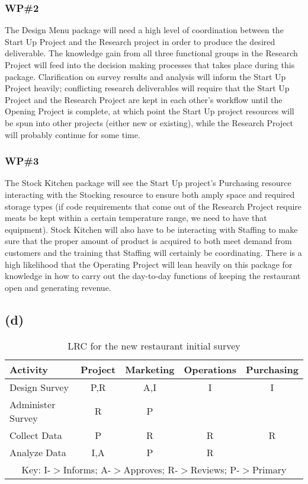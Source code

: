 \documentclass{article}
\begin{document}
	\subsubsection*{WP\#2}
	The Design Menu package will need a high level of coordination between the Start Up Project and the Research project in order to produce the desired deliverable. The knowledge gain from all three functional groups in the 		Research Project will feed into the decision making processes that takes place during this package. Clarification on survey results and analysis will inform the Start Up Project heavily; conflicting research deliverables will require 		that the Start Up Project and the Research Project are kept in each other's workflow until the Opening Project is complete, at which point the Start Up project resources will be spun into other projects (either new or existing), while 	the Research Project will probably 	continue for some time.
	\subsubsection*{WP\#3}
	The Stock Kitchen package will see the Start Up project's Purchasing resource interacting with the Stocking resource to ensure both amply space and required storage types (if code requirements that come out of the Research 		Project require meats be kept within a certain temperature range, we need to have that equipment). Stock Kitchen will also have to be interacting with Staffing to make sure that the proper amount of product is acquired to both meet 	demand from customers and the training that Staffing will certainly be coordinating. 
	\newline
	There is a high likelihood that the Operating Project will lean heavily on this package for knowledge in how to carry out the day-to-day functions of keeping the restaurant open and generating revenue.
		
	\subsection*{\quad(d)}
	{\renewcommand{\arraystretch}{1.2} 
	\begin{table}[h!]
  		\begin{center}
    		\caption{LRC for the new restaurant initial survey}
    		\label{tab:table1}
			
    		\begin{tabular}{lcccc}
				Activity & Project & Marketing & Operations & Purchasing\\
				\hline
      			Design Survey & P,R & A,I & I & I\\
      			Administer Survey & R & P &  & \\
				Collect Data & P & R & R & R \\
				Analyze Data & I,A & P & R & \\
				\hline
				
				\multicolumn{5}{c}{Key: I-$>$Informs; A-$>$Approves; R-$>$Reviews; P-$>$Primary} \\
    		\end{tabular}
  		\end{center}
	\end{table}
	}
	
\end{document}
